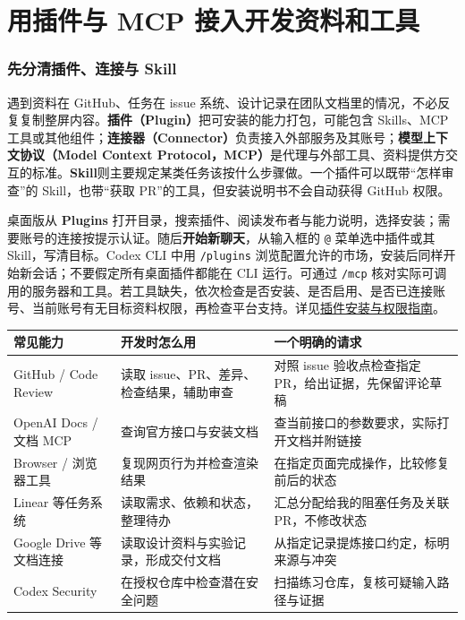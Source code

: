 \section{用插件与 MCP 接入开发资料和工具}
\label{sec:ai-plugins}

\subsubsection{先分清插件、连接与 Skill}

遇到资料在 GitHub、任务在 issue 系统、设计记录在团队文档里的情况，不必反复复制整屏内容。\textbf{插件（Plugin）}把可安装的能力打包，可能包含 Skills、MCP 工具或其他组件；\textbf{连接器（Connector）}负责接入外部服务及其账号；\textbf{模型上下文协议（Model Context Protocol，MCP）}是代理与外部工具、资料提供方交互的标准。\textbf{Skill}则主要规定某类任务该按什么步骤做。一个插件可以既带“怎样审查”的 Skill，也带“获取 PR”的工具，但安装说明书不会自动获得 GitHub 权限。

桌面版从 \textbf{Plugins} 打开目录，搜索插件、阅读发布者与能力说明，选择安装；需要账号的连接按提示认证。随后\textbf{开始新聊天}，从输入框的 \texttt{@} 菜单选中插件或其 Skill，写清目标。Codex CLI 中用 \texttt{/plugins} 浏览配置允许的市场，安装后同样开始新会话；不要假定所有桌面插件都能在 CLI 运行。可通过 \texttt{/mcp} 核对实际可调用的服务器和工具。若工具缺失，依次检查是否安装、是否启用、是否已连接账号、当前账号有无目标资料权限，再检查平台支持。详见\href{https://learn.chatgpt.com/docs/plugins}{插件安装与权限指南}。

\begin{center}
\begin{tabular}{p{}p{}p{}}
\toprule
常见能力 & 开发时怎么用 & 一个明确的请求 \\
\midrule
GitHub / Code Review & 读取 issue、PR、差异、检查结果，辅助审查 & 对照 issue 验收点检查指定 PR，给出证据，先保留评论草稿 \\
OpenAI Docs / 文档 MCP & 查询官方接口与安装文档 & 查当前接口的参数要求，实际打开文档并附链接 \\
Browser / 浏览器工具 & 复现网页行为并检查渲染结果 & 在指定页面完成操作，比较修复前后的状态 \\
Linear 等任务系统 & 读取需求、依赖和状态，整理待办 & 汇总分配给我的阻塞任务及关联 PR，不修改状态 \\
Google Drive 等文档连接 & 读取设计资料与实验记录，形成交付文档 & 从指定记录提炼接口约定，标明来源与冲突 \\
Codex Security & 在授权仓库中检查潜在安全问题 & 扫描练习仓库，复核可疑输入路径与证据 \\
\bottomrule
\end{tabular}
\end{center}

